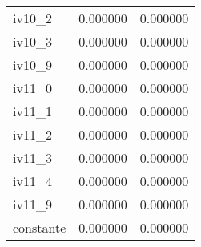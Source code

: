 \begin{tabular}{lrr}
iv10_2 & 0.000000 & 0.000000 \\
iv10_3 & 0.000000 & 0.000000 \\
iv10_9 & 0.000000 & 0.000000 \\
iv11_0 & 0.000000 & 0.000000 \\
iv11_1 & 0.000000 & 0.000000 \\
iv11_2 & 0.000000 & 0.000000 \\
iv11_3 & 0.000000 & 0.000000 \\
iv11_4 & 0.000000 & 0.000000 \\
iv11_9 & 0.000000 & 0.000000 \\
constante & 0.000000 & 0.000000 \\
\bottomrule
\end{tabular}
